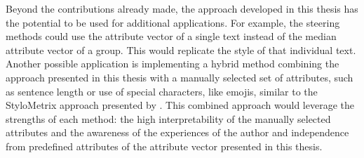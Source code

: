 Beyond the contributions already made, the approach developed in this thesis has the potential to be used for additional applications. For example, the steering methods could use the attribute vector of a single text instead of the median attribute vector of a group. This would replicate the style of that individual text. Another possible application is implementing a hybrid method combining the approach presented in this thesis with a manually selected set of attributes, such as sentence length or use of special characters, like emojis, similar to the StyloMetrix approach presented by \citet{okulskaStyloMetrixOpensourceMultilingual2023}. This combined approach would leverage the strengths of each method: the high interpretability of the manually selected attributes and the awareness of the experiences of the author and independence from predefined attributes of the attribute vector presented in this thesis.
